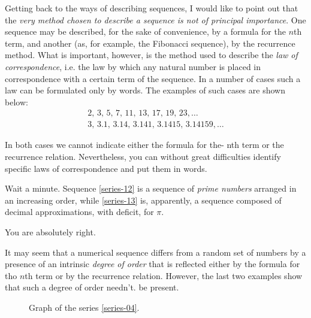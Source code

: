 {Getting back to the ways of describing sequences, I would like to point out that the \emph{very method chosen to describe a sequence is not of principal importance}. One sequence may be described, for the sake of convenience, by a formula for the $n$th term, and another (as, for example, the Fibonacci sequence), by the recurrence method. What is important, however, is the method used to describe the \emph{law of correspondence}, i.e. the law by which any natural number is placed in correspondence with a certain term of the sequence. In a number of cases such a law can be formulated only by words. The examples of such cases are shown below:
\begin{align}%
2, \, 3, \, 5, \, 7, \, 11, \, 13, \, 17, \, 19, \, 23, \ldots \label{series-12}\\
3,  \, 3.1, \,  3.14, \,  3.141, \,  3.1415, \,  3.14159, \ldots \label{series-13}
\end{align}

In both cases we cannot indicate either the formula for the- nth term or the recurrence relation. Nevertheless, you can without great difficulties identify specific laws of correspondence and put them in words.

\rdr Wait a minute. Sequence \eqref{series-12} is a sequence of \emph{prime numbers} arranged in an increasing order, while \eqref{series-13} is, apparently, a sequence composed of decimal approximations, with deficit, for $\pi$.

\athr You are absolutely right.

\rdr It may seem that a numerical sequence differs from a random set of numbers by a presence of an intrinsic \emph{degree of order} that is reflected either by the formula for tho $n$th term or by the recurrence relation. However, the last two examples show that such a degree of order needn't. be present.

\begin{figure}[!h]
\centering

\caption{Graph of the series \eqref{series-04}.}
\label{fig-02}
\end{figure}

}
